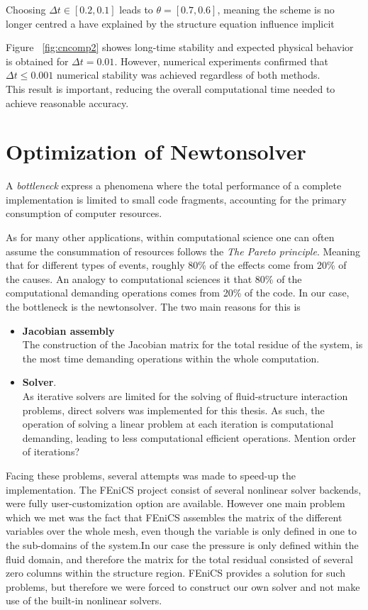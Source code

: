 Choosing $\Delta t \in [0.2, 0.1]$ leads to $\theta = [0.7, 0.6]$, meaning the scheme is no longer centred a have \cite{Formaggia2004} explained by the structure equation influence  implicit  


 Figure ~\ref{fig:cncomp2} showes long-time stability and expected physical behavior is obtained for $\Delta t = 0.01$. However, numerical experiments confirmed that  $\Delta t \leq 0.001$ numerical stability was achieved regardless of both methods. \\

 This result is important, reducing the overall computational time needed to achieve reasonable accuracy.


\newpage
\section{Optimization of Newtonsolver}
A \textit{bottleneck} express a phenomena where the total performance of a complete implementation is limited to small code fragments, accounting for the primary consumption of computer resources.

As for many other applications, within computational science one can often assume the consummation of resources follows the \textit{The Pareto principle}. Meaning that for different types of events, roughly 80\% of the effects come from 20\% of the causes. An analogy to computational sciences it that 80\% of the computational demanding operations comes from 20\% of the code. In our case, the bottleneck is the newtonsolver. The two main reasons for this is 

\begin{itemize}
\item \textbf{Jacobian assembly} \\
The construction of the Jacobian matrix for the total residue of the system, is the most time demanding operations within the whole computation. 
\item \textbf{Solver}. \\ 
As iterative solvers are limited for the solving of fluid-structure interaction problems, direct solvers was implemented for this thesis. As such, the operation of solving a linear problem at each iteration is computational demanding, leading to  less computational efficient operations. Mention order of iterations?
\end{itemize}

Facing these problems, several attempts was made to speed-up the implementation. The FEniCS project consist of several nonlinear solver backends, were fully user-customization option are available. However one main problem which we met was the fact that FEniCS assembles the matrix of the different variables over the whole mesh, even though the variable is only defined in one to the sub-domains of the system.In our case the pressure is only defined within the fluid domain, and therefore the matrix for the total residual consisted of several zero columns within the structure region. FEniCS provides a solution for such problems, but therefore we were forced to construct our own solver and not make use of the built-in nonlinear solvers. \\

